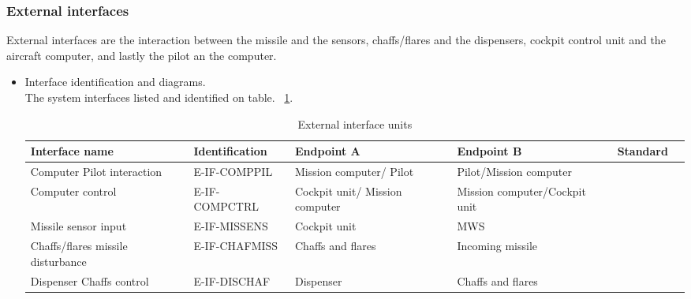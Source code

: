 \subsubsection{External interfaces}
External interfaces are the interaction between the missile and the sensors, chaffs/flares and the dispensers, cockpit control unit and the aircraft computer, and lastly the pilot an the computer.
\begin{itemize}
\item {Interface identification and diagrams.}\\
The system interfaces listed and identified on table. ~\ref{tab:External}.


\begin{center}
\begin{table}[h]
\caption{External interface units}
\label{tab:External}
\begin{tabular}{ | p{2cm} | l | p{2.3cm} | p{2.3cm} | l | p{1cm} |}
\hline
 \textbf{Interface name} & \textbf{Identification} & \textbf{Endpoint A} & \textbf{Endpoint B} & \textbf{Standard}\\ \hline
Computer Pilot interaction & E-IF-COMPPIL & Mission computer/ Pilot & Pilot/Mission computer & \\ \hline
 Computer control & E-IF-COMPCTRL & Cockpit unit/ Mission computer &Mission computer/Cockpit unit & \\ \hline
Missile sensor input & E-IF-MISSENS & Cockpit unit & MWS & \\ \hline
Chaffs/flares missile disturbance& E-IF-CHAFMISS & Chaffs and flares & Incoming missile & \\ \hline
Dispenser Chaffs control & E-IF-DISCHAF & Dispenser & Chaffs and flares & \\ \hline
\end{tabular}
\end{table}
\end{center}


\end{itemize}

